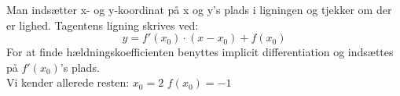 \documentclass[../main.tex]{subfiles}
\begin{document}
\begin{tcolorbox}[title=Opgave 6,
    colback=blue!1!white,
    colframe=black,
    colbacktitle=blue!25!white,
    coltitle=red!25!black,
    fonttitle=\bfseries,
    subtitle style={boxrule=0.4pt,
    colback=blue!7!white} ]
        Man indsætter x- og y-koordinat på x og y's plads i ligningen og tjekker om der er lighed.
        Tagentens ligning skrives ved:
        \[y=f'(x_0)\cdot (x-x_0)+f(x_0)\]
        For at finde hældningskoefficienten benyttes implicit differentiation og indsættes på \(f'(x_0)\)'s plads.\\
        Vi kender allerede resten:\;\; \(x_0=2\)\;\;\; \(f(x_0)=-1\)
\end{tcolorbox}
\end{document}
